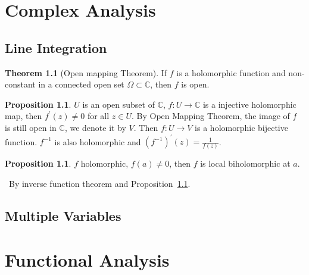 \documentclass[12pt,a4paper]{book}
\newenvironment{prooff}{{\noindent\it\textcolor{cyan!40!black}{Proof}:}\,}{\par}
\newcommand{\bb}[1]{\mathbb{#1}}
\newcommand{\p}{^{\prime}}
\theoremstyle{definition}
\newtheorem{theo}[defn]{Theorem}
\newtheorem{prop}[defn]{Proposition}
\begin{document}
\chapter{Complex Analysis}
\section{Line Integration}
\begin{theo}[Open mapping Theorem]
    If $f$ is a holomorphic function and non-constant in a connected open set $\Omega\subset \bb{C}$, then $f$ is open.
\end{theo}


\begin{prop}
    $U$ is an open subset of $\bb{C}$, $f:U\rightarrow \bb{C}$ is a injective holomorphic map, then $f\p(z)\neq 0$ for all $z\in U$. By Open Mapping Theorem, the image of $f$ is still open in $\bb{C}$, we denote it by $V$. Then $f:U\rightarrow V$ is a holomorphic bijective function. $f^{-1}$ is also holomorphic and $(f^{-1})\p(z)=\frac{1}{f(z)}$.
\end{prop}
\begin{prop}
    $f$ holomorphic, $f(a)\neq 0$, then $f$ is local biholomorphic at $a$.
    \label{proposition:holomorphic injective}
\end{prop}
\begin{prooff}
    By inverse function theorem and Proposition~\ref{proposition:holomorphic injective}.
\end{prooff}





\newpage
\section{Multiple Variables}


\chapter{Functional Analysis}
\end{document}
